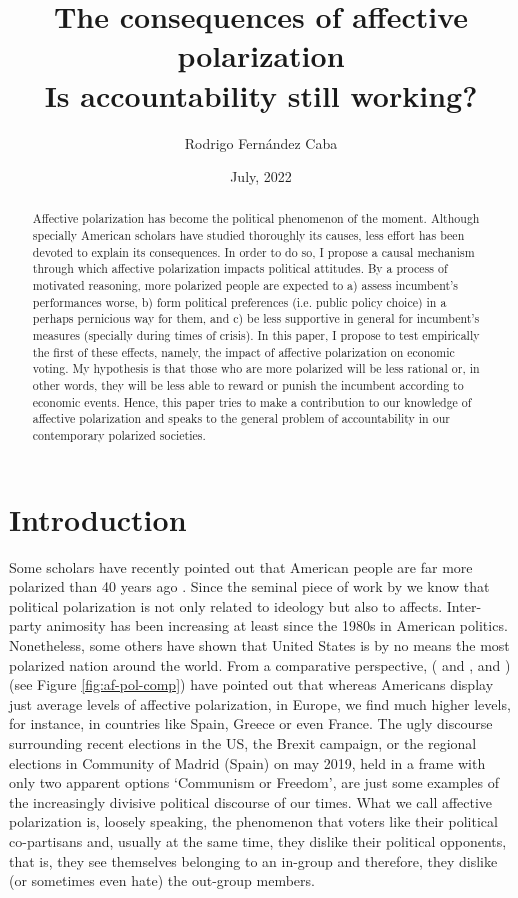 \documentclass[a4paper, svgnames]{article}
\title{\vspace{-40pt}\textbf{The consequences of affective polarization\\ \Large Is accountability still working?}}
\author{Rodrigo Fernández Caba}
\date{\vspace{-5pt} July, 2022}
\begin{document}
\maketitle

\begin{abstract}
	Affective polarization has become the political phenomenon of the moment. Although specially American scholars have studied thoroughly its causes, less effort has been devoted to explain its consequences. In order to do so, I propose a causal mechanism through which affective polarization impacts political attitudes. By a process of motivated reasoning, more polarized people are expected to a) assess incumbent's performances worse, b) form political preferences (i.e. public policy choice) in a perhaps pernicious way for them, and c) be less supportive in general for incumbent's measures (specially during times of crisis). In this paper, I propose to test empirically the first of these effects, namely, the impact of affective polarization on economic voting. My hypothesis is that those who are more polarized will be less rational or, in other words, they will be less able to reward or punish the incumbent according to economic events. Hence, this paper tries to make a contribution to our knowledge of affective polarization and speaks to the general problem of accountability in our contemporary polarized societies.
\end{abstract}


\section{Introduction}

Some scholars have recently pointed out that American people are far more polarized than 40 years ago \citep{Lelkes2018}. Since the seminal piece of work by \cite{Iyengar2012} we know that political polarization is not only related to ideology but also to affects. Inter-party animosity has been increasing at least since the 1980s in American politics. Nonetheless, some others have shown that United States is by no means the most polarized nation around the world. From a comparative perspective, (\citeauthor{Gidron2018} \citeyear{Gidron2018} and \citeyear{Gidron2019}, and \cite{WESTWOOD2018}) (see Figure \ref{fig:af-pol-comp}) have pointed out that whereas Americans display just average levels of affective polarization, in Europe, we find much higher levels, for instance, in countries like Spain, Greece or even France. The ugly discourse surrounding recent elections in the US, the Brexit campaign, or the regional elections in Community of Madrid (Spain) on may 2019, held in a frame with only two apparent options `Communism or Freedom', are just some examples of the increasingly divisive political discourse of our times. What we call affective polarization is, loosely speaking, the phenomenon that voters like their political co-partisans and, usually at the same time, they dislike their political opponents, that is, they see themselves belonging to an in-group and therefore, they dislike (or sometimes even hate) the out-group members.
\end{document}
